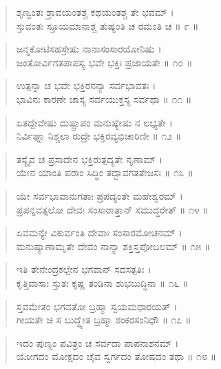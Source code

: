 \begin{verse}
ಶೃಣ್ವಂತಃ ಶ್ರಾವಯಂತಶ್ಚ ಕಥಯಂತಶ್ಚ ತೇ ಭವಮ್ ।\\ಸ್ತುವಂತಃ ಸ್ತೂಯಮಾನಾಶ್ಚ ತುಷ್ಯಂತಿ ಚ ರಮಂತಿ ಚ \num{॥ ೯ ॥}
\end{verse}

\begin{verse}
ಜನ್ಮಕೋಟಿಸಹಸ್ರೇಷು ನಾನಾಸಂಸಾರಯೋನಿಷು ।\\ಜಂತೋರ್ವಿಗತಪಾಪಸ್ಯ ಭವೇ ಭಕ್ತಿಃ ಪ್ರಜಾಯತೇ \num{॥ ೧೦ ॥}
\end{verse}

\begin{verse}
ಉತ್ಪನ್ನಾ ಚ ಭವೇ ಭಕ್ತಿರನನ್ಯಾ ಸರ್ವಭಾವತಃ ।\\ಭಾವಿನಃ ಕಾರಣೇ ಚಾಸ್ಯ ಸರ್ವಯುಕ್ತಸ್ಯ ಸರ್ವಥಾ \num{॥ ೧೧ ॥}
\end{verse}

\begin{verse}
ಏತದ್ದೇವೇಷು ದುಷ್ಪ್ರಾಪಂ ಮನುಷ್ಯೇಷು ನ ಲಭ್ಯತೇ ।\\ನಿರ್ವಿಘ್ನಾ ನಿಶ್ಚಲಾ ರುದ್ರೇ ಭಕ್ತಿರವ್ಯಭಿಚಾರಿಣೀ \num{॥ ೧೨ ॥}
\end{verse}

\begin{verse}
ತಸ್ಯೈವ ಚ ಪ್ರಸಾದೇನ ಭಕ್ತಿರುತ್ಪದ್ಯತೇ ನೃಣಾಮ್ ।\\ಯೇನ ಯಾಂತಿ ಪರಾಂ ಸಿದ್ಧಿಂ ತದ್ಭಾವಗತತೇಜಸಃ \num{॥ ೧೩ ॥}
\end{verse}

\begin{verse}
ಯೇ ಸರ್ವಭಾವಾನುಗತಾಃ ಪ್ರಪದ್ಯಂತೇ ಮಹೇಶ್ವರಮ್ ।\\ಪ್ರಪನ್ನವತ್ಸಲೋ ದೇವಃ ಸಂಸಾರಾತ್ತಾನ್ ಸಮುದ್ಧರೇತ್ \num{॥ ೧೪ ॥}
\end{verse}

\begin{verse}
ಏವಮನ್ಯೇ ವಿಕುರ್ವಂತಿ ದೇವಾಃ ಸಂಸಾರಮೋಚನಮ್ ।\\ಮನುಷ್ಯಾಣಾಮೃತೇ ದೇವಂ ನಾನ್ಯಾ ಶಕ್ತಿಸ್ತಪೋಬಲಮ್ \num{॥ ೧೫ ॥}
\end{verse}

\begin{verse}
ಇತಿ ತೇನೇಂದ್ರಕಲ್ಪೇನ ಭಗವಾನ್ ಸದಸತ್ಪತಿಃ ।\\ಕೃತ್ತಿವಾಸಾಃ ಸ್ತುತಃ ಕೃಷ್ಣ ತಂಡಿನಾ ಶುಭಬುದ್ಧಿನಾ \num{॥ ೧೬ ॥}
\end{verse}

\begin{verse}
ಸ್ತವಮೇತಂ ಭಗವತೋ ಬ್ರಹ್ಮಾ ಸ್ವಯಮಧಾರಯತ್ ।\\ಗೀಯತೇ ಚ ಸ ಬುದ್ಧ್ಯೇತ ಬ್ರಹ್ಮಾ ಶಂಕರಸಂನಿಧೌ \num{॥ ೧೭ ॥}
\end{verse}

\begin{verse}
ಇದಂ ಪುಣ್ಯಂ ಪವಿತ್ರಂ ಚ ಸರ್ವದಾ ಪಾಪನಾಶನಮ್ ।\\ಯೋಗದಂ ಮೋಕ್ಷದಂ ಚೈವ ಸ್ವರ್ಗದಂ ತೋಷದಂ ತಥಾ \num{॥ ೧೮ ॥}
\end{verse}

